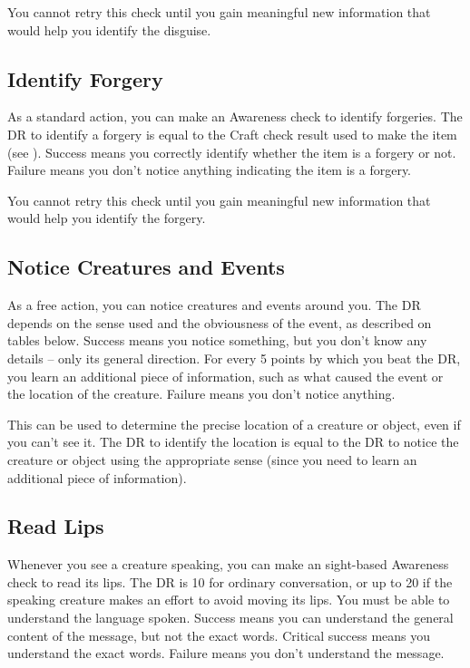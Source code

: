         You cannot retry this check until you gain meaningful new information that would help you identify the disguise.

    \subsection{Identify Forgery}
        As a standard action, you can make an Awareness check to identify forgeries.
        The DR to identify a forgery is equal to the Craft check result used to make the item (see ).
        Success means you correctly identify whether the item is a forgery or not.
        Failure means you don't notice anything indicating the item is a forgery.

        You cannot retry this check until you gain meaningful new information that would help you identify the forgery.

    \subsection{Notice Creatures and Events}
        As a free action, you can notice creatures and events around you.
        The DR depends on the sense used and the obviousness of the event, as described on tables below.
        Success means you notice something, but you don't know any details -- only its general direction.
        For every 5 points by which you beat the DR, you learn an additional piece of information, such as what caused the event or the location of the creature.
        Failure means you don't notice anything.

        This can be used to determine the precise location of a creature or object, even if you can't see it. The DR to identify the location is equal to the DR to notice the creature or object using the appropriate sense  (since you need to learn an additional piece of information).

    \subsection{Read Lips}
        Whenever you see a creature speaking, you can make an sight-based Awareness check to read its lips.
        The DR is 10 for ordinary conversation, or up to 20 if the speaking creature makes an effort to avoid moving its lips.
        You must be able to understand the language spoken.
        Success means you can understand the general content of the message, but not the exact words.
        Critical success means you understand the exact words.
        Failure means you don't understand the message.

